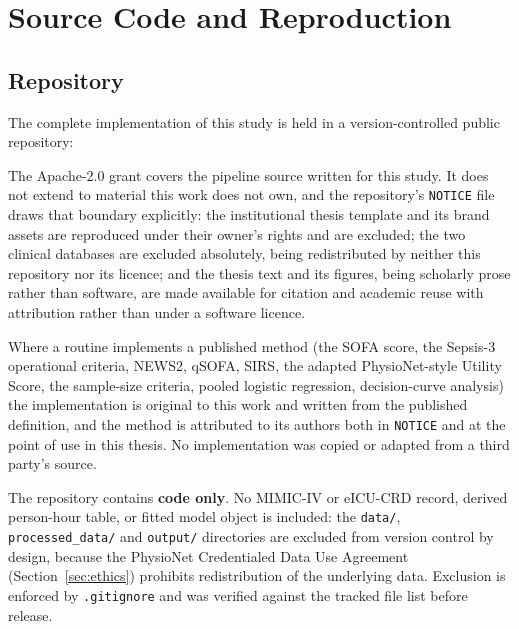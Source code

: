 \chapter{Source Code and Reproduction}
\label{app:code}

\section{Repository}
\label{app:repo}

The complete implementation of this study is held in a version-controlled
public repository:

\begin{center}
\end{center}

The Apache-2.0 grant covers the pipeline source written for this study. It does
not extend to material this work does not own, and the repository's
\texttt{NOTICE} file draws that boundary explicitly: the institutional thesis
template and its brand assets are reproduced under their owner's rights and are
excluded; the two clinical databases are excluded absolutely, being redistributed
by neither this repository nor its licence; and the thesis text and its figures,
being scholarly prose rather than software, are made available for citation and
academic reuse with attribution rather than under a software licence.

Where a routine implements a published method (the SOFA score, the Sepsis-3
operational criteria, NEWS2, qSOFA, SIRS, the adapted PhysioNet-style Utility
Score, the
sample-size criteria, pooled logistic regression, decision-curve analysis) the
implementation is original to this work and written from the published
definition, and the method is attributed to its authors both in \texttt{NOTICE}
and at the point of use in this thesis. No implementation was copied or adapted
from a third party's source.

The repository contains \textbf{code only}. No MIMIC-IV or eICU-CRD record,
derived person-hour table, or fitted model object is included: the
\texttt{data/}, \texttt{processed\_data/} and \texttt{output/} directories are
excluded from version control by design, because the PhysioNet Credentialed
Data Use Agreement (Section~\ref{sec:ethics}) prohibits redistribution of the
underlying data. Exclusion is enforced by \texttt{.gitignore} and was verified
against the tracked file list before release.

